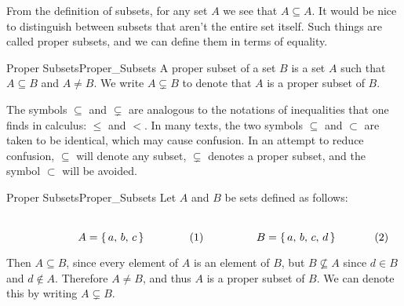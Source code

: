             From the definition of subsets, for any set $A$ we see that
            $A\subseteq{A}$. It would be nice to distinguish between subsets
            that aren't the entire set itself. Such things are called
            proper subsets, and we can define them in terms of equality.
            \begin{fdefinition}{Proper Subsets}{Proper_Subsets}
                A proper subset of a set $B$ is a set $A$ such that
                $A\subseteq{B}$ and $A\ne{B}$. We write $A\subsetneq{B}$
                to denote that $A$ is a proper subset of $B$.
            \end{fdefinition}
            The symbols $\subseteq$ and $\subsetneq$ are analogous to the
            notations of inequalities that one finds in calculus: $\leq$
            and $<$. In many texts, the two symbols $\subseteq$ and
            $\subset$ are taken to be identical, which may cause confusion.
            In an attempt to reduce confusion, $\subseteq$ will denote any
            subset, $\subsetneq$ denotes a proper subset, and the symbol
            $\subset$ will be avoided.
            \begin{lexample}{Proper Subsets}{Proper_Subsets}
                Let $A$ and $B$ be sets defined as follows:
                \par
                \begin{subequations}
                    \begin{minipage}[b]{0.49\textwidth}
                        \centering
                        \begin{equation}
                            A=\{\,a,\,b,\,c\,\}
                        \end{equation}
                    \end{minipage}
                    \hfill
                    \begin{minipage}[b]{0.49\textwidth}
                        \centering
                        \begin{equation}
                            B=\{\,a,\,b,\,c,\,d\,\}
                        \end{equation}
                    \end{minipage}
                \end{subequations}
                \par\vspace{2.5ex}
                Then $A\subseteq{B}$, since every element of $A$ is an
                element of $B$, but $B\nsubseteq{A}$ since $d\in{B}$ and
                $d\notin{A}$. Therefore $A\ne{B}$, and thus $A$ is a proper
                subset of $B$. We can denote this by writing $A\subsetneq{B}$.
            \end{lexample}
